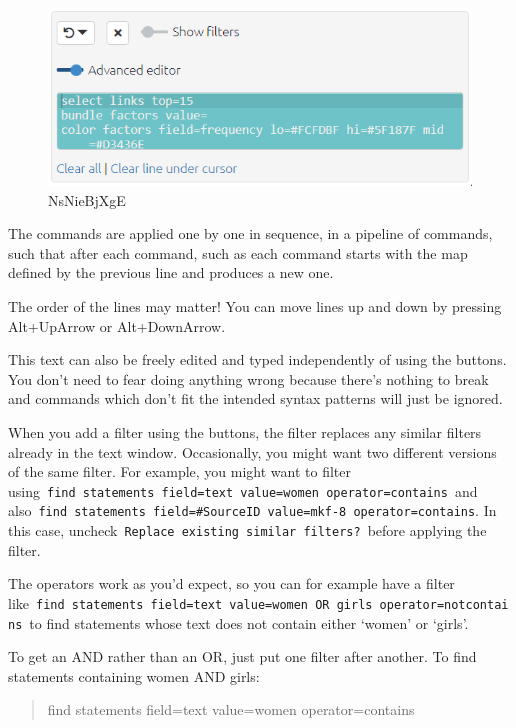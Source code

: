 \documentclass[
]{book}
\begin{document}
\begin{figure}
\centering
\includegraphics[width=6.77083in,height=\textheight]{_assets/NsNieBjXgE.gif}
\caption{NsNieBjXgE}
\end{figure}

The commands are applied one by one in sequence, in a pipeline of commands, such that after each command, such as each command starts with the map defined by the previous line and produces a new one.

The order of the lines may matter! You can move lines up and down by pressing Alt+UpArrow or Alt+DownArrow.

This text can also be freely edited and typed independently of using the buttons. You don't need to fear doing anything wrong because there's nothing to break and commands which don't fit the intended syntax patterns will just be ignored.

When you add a filter using the buttons, the filter replaces any similar filters already in the text window. Occasionally, you might want two different versions of the same filter. For example, you might want to filter using~\texttt{find\ statements\ field=text\ value=women\ operator=contains}~and also~\texttt{find\ statements\ field=\#SourceID\ value=mkf-8\ operator=contains}. In this case, uncheck~\texttt{Replace\ existing\ similar\ filters?}~before applying the filter.

The operators work as you'd expect, so you can for example have a filter like~\texttt{find\ statements\ field=text\ value=women\ OR\ girls\ operator=notcontains}~to find statements whose text does not contain either `women' or `girls'.

To get an AND rather than an OR, just put one filter after another. To find statements containing women AND girls:

\begin{quote}
find statements field=text value=women operator=contains
\end{quote}
\end{document}

